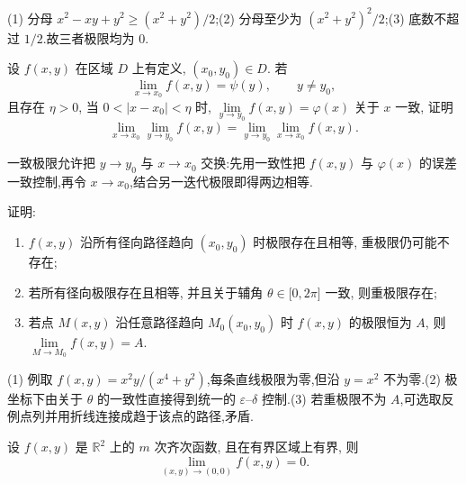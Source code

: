 \begin{solution}

    (1) 分母 $x^2-xy+y^2\geq(x^2+y^2)/2$;(2) 分母至少为 $(x^2+y^2)^2/2$;(3) 底数不超过 $1/2$.故三者极限均为 $0$.
\end{solution}

\begin{example}
    设 $f(x,y)$ 在区域 $D$ 上有定义, $(x_0,y_0)\in D$. 若
    \[
        \displaystyle\lim\limits_{x\to x_0}f(x,y)=\psi(y),\qquad y\ne y_0,
    \]
    且存在 $\eta>0$, 当 $0<|x-x_0|<\eta$ 时, $\displaystyle\lim\limits_{y\to y_0}f(x,y)=\varphi(x)$ 关于 $x$ 一致, 证明
    \[
        \displaystyle\lim\limits_{x\to x_0}\lim\limits_{y\to y_0}f(x,y)
        =\lim\limits_{y\to y_0}\lim\limits_{x\to x_0}f(x,y).
    \]
\end{example}
\exampleblank

\begin{solution}
    一致极限允许把 $y\to y_0$ 与 $x\to x_0$ 交换:先用一致性把 $f(x,y)$ 与 $\varphi(x)$ 的误差一致控制,再令 $x\to x_0$,结合另一迭代极限即得两边相等.
\end{solution}

\begin{example}[\markstar]
    证明:
    \begin{enumerate}
        \item $f(x,y)$ 沿所有径向路径趋向 $(x_0,y_0)$ 时极限存在且相等, 重极限仍可能不存在;
        \item 若所有径向极限存在且相等, 并且关于辅角 $\theta\in\lbrack0,2\pi\rbrack$ 一致, 则重极限存在;
        \item 若点 $M(x,y)$ 沿任意路径趋向 $M_0(x_0,y_0)$ 时 $f(x,y)$ 的极限恒为 $A$, 则 $\displaystyle\lim\limits_{M\to M_0}f(x,y)=A$.
    \end{enumerate}
\end{example}
\exampleblank

\begin{solution}

    (1) 例取 $f(x,y)=x^2y/(x^4+y^2)$,每条直线极限为零,但沿 $y=x^2$ 不为零.(2) 极坐标下由关于 $\theta$ 的一致性直接得到统一的 $\varepsilon$--$\delta$ 控制.(3) 若重极限不为 $A$,可选取反例点列并用折线连接成趋于该点的路径,矛盾.
\end{solution}

\begin{example}
    设 $f(x,y)$ 是 $\mathbb{R}^2$ 上的 $m$ 次齐次函数, 且在有界区域上有界, 则
    \[
        \displaystyle\lim\limits_{(x,y)\to(0,0)}f(x,y)=0.
    \]
\end{example}
\exampleblank

